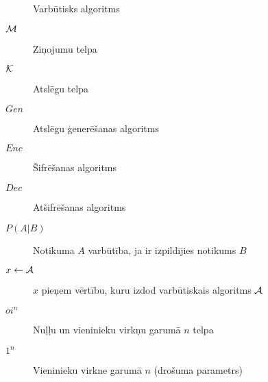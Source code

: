 \begin{description}
    \item[\ppt] Varbūtisks algoritms
    \item[$\mathcal{M}$]Ziņojumu telpa
    \item[$\mathcal{K}$]Atslēgu telpa
    \item[$Gen$]Atslēgu ģenerēšanas algoritms
    \item[$Enc$]Šifrēšanas algoritms
    \item[$Dec$]Atšifrēšanas algoritms
    \item[$P(A|B)$]Notikuma $A$ varbūtība, ja ir izpildījies notikums $B$
    \item[$x \leftarrow \mathcal{A}$]$x$ pieņem vērtību, kuru izdod varbūtiskais algoritms $\mathcal{A}$
    \item[$oi^n$]Nuļļu un vieninieku virkņu garumā $n$ telpa
    \item[$1^n$]Vieninieku virkne garumā $n$ (drošuma parametrs)
\end{description}
